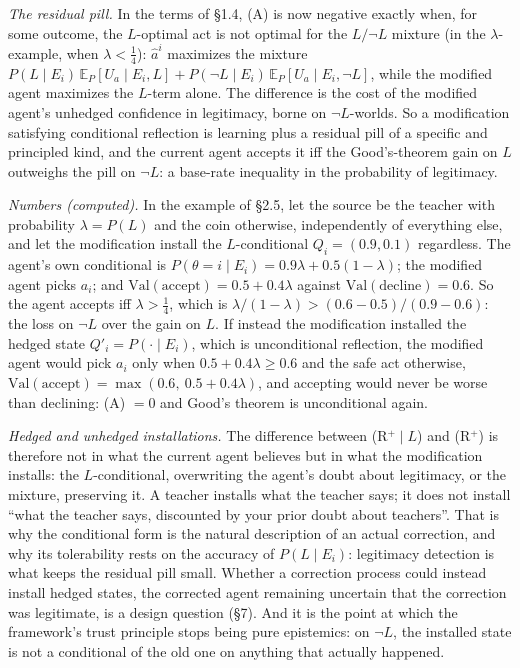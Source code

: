 \documentclass[11pt,a4paper]{article}
\begin{document}
\emph{The residual pill.} In the terms of \S1.4, (A) is now negative exactly when, for some outcome, the $L$-optimal act is not optimal for the $L/\neg L$ mixture (in the $\lambda$-example, when $\lambda < \tfrac14$): $\hat a^i$ maximizes the mixture $P(L \mid E_i)\,\mathbb E_P[ U_a \mid E_i, L] + P(\neg L \mid E_i)\,\mathbb E_P[ U_a \mid E_i, \neg L]$, while the modified agent maximizes the $L$-term alone. The difference is the cost of the modified agent's unhedged confidence in legitimacy, borne on $\neg L$-worlds. So a modification satisfying conditional reflection is learning plus a residual pill of a specific and principled kind, and the current agent accepts it iff the Good's-theorem gain on $L$ outweighs the pill on $\neg L$: a base-rate inequality in the probability of legitimacy.

\emph{Numbers (computed).} In the example of \S2.5, let the source be the teacher with probability $\lambda = P(L)$ and the coin otherwise, independently of everything else, and let the modification install the $L$-conditional $Q_i = (0.9, 0.1)$ regardless. The agent's own conditional is $P(\theta = i \mid E_i) = 0.9\lambda + 0.5(1 - \lambda)$; the modified agent picks $a_i$; and $\mathrm{Val}(\text{accept}) = 0.5 + 0.4\lambda$ against $\mathrm{Val}(\text{decline}) = 0.6$. So the agent accepts iff $\lambda > \tfrac14$, which is $\lambda/(1-\lambda) > (0.6 - 0.5)/(0.9 - 0.6)$: the loss on $\neg L$ over the gain on $L$. If instead the modification installed the hedged state $Q'_i = P(\cdot \mid E_i)$, which is unconditional reflection, the modified agent would pick $a_i$ only when $0.5 + 0.4\lambda \ge 0.6$ and the safe act otherwise, $\mathrm{Val}(\text{accept}) = \max(0.6,\ 0.5 + 0.4\lambda)$, and accepting would never be worse than declining: (A) $= 0$ and Good's theorem is unconditional again.

\emph{Hedged and unhedged installations.} The difference between (R$^+\mid L$) and (R$^+$) is therefore not in what the current agent believes but in what the modification installs: the $L$-conditional, overwriting the agent's doubt about legitimacy, or the mixture, preserving it. A teacher installs what the teacher says; it does not install ``what the teacher says, discounted by your prior doubt about teachers''. That is why the conditional form is the natural description of an actual correction, and why its tolerability rests on the accuracy of $P(L \mid E_i)$: legitimacy detection is what keeps the residual pill small. Whether a correction process could instead install hedged states, the corrected agent remaining uncertain that the correction was legitimate, is a design question (\S7). And it is the point at which the framework's trust principle stops being pure epistemics: on $\neg L$, the installed state is not a conditional of the old one on anything that actually happened.
\end{document}
